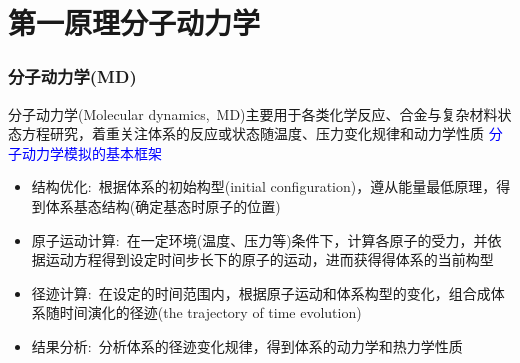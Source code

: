 \small
%
\section{第一原理分子动力学}
\frame
{
	\frametitle{分子动力学\textrm{(MD)}}
	分子动力学\textrm{(Molecular dynamics,~MD)}主要用于各类化学反应、合金与复杂材料状态方程研究，着重关注体系的反应或状态随温度、压力变化规律和动力学性质
\vskip 5pt
\textcolor{blue}{分子动力学模拟的基本框架}
	\begin{itemize}
		\item 结构优化:~根据体系的初始构型\textrm{(initial configuration)}，遵从能量最低原理，得到体系基态结构(确定基态时原子的位置)
		\item 原子运动计算:~在一定环境(温度、压力等)条件下，计算各原子的受力，并依据运动方程得到设定时间步长下的原子的运动，进而获得得体系的当前构型
		\item 径迹计算:~在设定的时间范围内，根据原子运动和体系构型的变化，组合成体系随时间演化的径迹\textrm{(the trajectory of time evolution)}
		\item 结果分析:~分析体系的径迹变化规律，得到体系的动力学和热力学性质
	\end{itemize}
}

